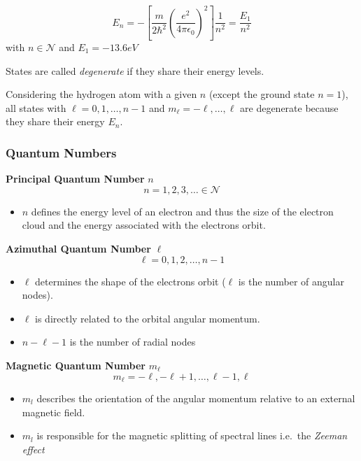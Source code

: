 
\begin{equation*}
    E_n = -\left[\frac{m}{2\hbar^2}{\left(\frac{e^2}{4\pi\epsilon_0}\right)}^2\right]\frac{1}{n^2} = \frac{E_1}{n^2}
\end{equation*}
with $n \in \mathcal{N}$ and $E_1 = -13.6eV$


States are called \textit{degenerate} if they share their energy levels.

Considering the hydrogen atom with a given $n$ (except the ground state $n=1$), all states with $\ell=0,1,\ldots, n-1$ and $m_\ell=-\ell, \ldots, \ell$ are degenerate because they share their energy $E_n$.


\subsubsection{Quantum Numbers}
\textbf{Principal Quantum Number} $n$
\noindent\begin{equation*}
    n = 1, 2, 3, \ldots \in \mathcal{N}
\end{equation*}
\begin{itemize}
    \item $n$ defines the energy level of an electron and thus the size of the electron cloud and the energy associated with the electrons orbit.
\end{itemize}

\newpar{}
\textbf{Azimuthal Quantum Number} $\ell$
\noindent\begin{equation*}
    \ell = 0, 1, 2, \ldots , n-1
\end{equation*}
\begin{itemize}
    \item $\ell$ determines the shape of the electrons orbit ($\ell$ is the number of angular nodes).
    \item $\ell$ is directly related to the orbital angular momentum.
    \item $n-\ell-1$ is the number of radial nodes
\end{itemize}

\newpar{}
\textbf{Magnetic Quantum Number} $m_\ell$
\noindent\begin{equation*}
    m_\ell =-\ell, -\ell+1, \ldots , \ell-1, \ell
\end{equation*}
\begin{itemize}
    \item $m_l$ describes the orientation of the angular momentum relative to an external magnetic field.
    \item $m_l$ is responsible for the magnetic splitting of spectral lines i.e.\ the \textit{Zeeman effect}
\end{itemize}

